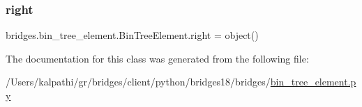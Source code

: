 \subsubsection{\texorpdfstring{right}{right}}
{\footnotesize\ttfamily bridges.\+bin\+\_\+tree\+\_\+element.\+Bin\+Tree\+Element.\+right = object()\hspace{0.3cm}{\ttfamily [static]}}



The documentation for this class was generated from the following file\+:\begin{DoxyCompactItemize}
\item 
/\+Users/kalpathi/gr/bridges/client/python/bridges18/bridges/\mbox{\hyperlink{bin__tree__element_8py}{bin\+\_\+tree\+\_\+element.\+py}}\end{DoxyCompactItemize}
